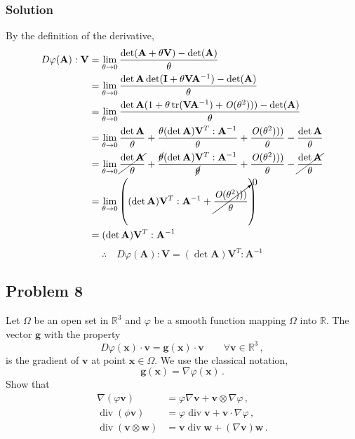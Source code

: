 \documentclass[letterpaper,10pt]{article}
\begin{document}
\subsubsection*{Solution}
By the definition of the derivative,
\begin{align*}
 D\varphi(\mathbf{A}):\mathbf{V}
&=\lim_{\theta\rightarrow 0}
\frac{\det(\mathbf{A}+\theta\mathbf{V})-\det(\mathbf{A} )}{\theta}\\
&=\lim_{\theta\rightarrow 0}
\frac{\det\mathbf{A}\det(\mathbf{I}+\theta\mathbf{V}\mathbf{A}^{-1})
-\det(\mathbf{A})}{\theta}\\
&=\lim_{\theta\rightarrow 0}
\frac{\det\mathbf{A}(1+\theta\,\mathrm{tr}(\mathbf{V}\mathbf{A}^{-1})+\mathit{O}
(\theta^2)))
-\det(\mathbf{A})}{\theta}\\
&=\lim_{\theta\rightarrow 0}
\frac{\det\mathbf{A}}{\theta}+
\frac{\theta(\det\mathbf{A})\mathbf{V}^T:\mathbf{A}^{-1}}{\theta}+
\frac{\mathit{O}(\theta^2)))}{\theta}-\frac{\det\mathbf{A}}{\theta}\\
&=\lim_{\theta\rightarrow 0}
\cancel{\frac{\det\mathbf{A}}{\theta}}+
\frac{\cancel{\theta}(\det\mathbf{A})\mathbf{V}^T:\mathbf{A}^{-1}}{\cancel{
\theta } } +
\frac{\mathit{O}(\theta^2)))}{\theta}-\cancel{\frac{\det\mathbf{A}}{\theta}}\\
&=\lim_{\theta\rightarrow 0}\left(
(\det\mathbf{A})\mathbf{V}^T:\mathbf{A}^{-1}+
\cancelto{0}{\frac{\mathit{O}(\theta^2)))}{\theta}}\right)\\
&=(\det\mathbf{A})\mathbf{V}^T:\mathbf{A}^{-1}
\end{align*}
\[
 \therefore \quad D\varphi(\mathbf{A}):\mathbf{V} =
(\det\mathbf{A})\mathbf{V}^T:\mathbf{A}^{-1}
\]

\subsection*{Problem 8}
Let $\Omega$ be an open set in $\mathbb{R}^3$ and $\varphi$ be a smooth
function mapping $\Omega$ into $\mathbb{R}$. The vector $\mathbf{g}$ with the
property
\[
 D\varphi(\mathbf{x})\cdot\mathbf{v}=\mathbf{g}(\mathbf{x})\cdot\mathbf{v}
\qquad \forall\mathbf{v}\in\mathbb{R}^3\,,
\]
is the gradient of $\mathbf{v}$ at point $\mathbf{x}\in\Omega$. We use the
classical notation,
\[
 \mathbf{g}(\mathbf{x})=\nabla\varphi(\mathbf{x})\,.
\]
Show that
\begin{align*}
\nabla(\varphi\mathbf{v})
&=\varphi\nabla\mathbf{v}+\mathbf{v}\otimes\nabla\varphi\,,\\
\operatorname{div}(\phi\mathbf{v})
&=\varphi\operatorname{div}\mathbf{v}+\mathbf{v}\cdot\nabla\varphi\,,\\
\operatorname{div}(\mathbf{v}\otimes\mathbf{w})
&=\mathbf{v}\operatorname{div}\mathbf{w}+(\nabla\mathbf{v})\mathbf{w}\,.
\end{align*}
\end{document}
